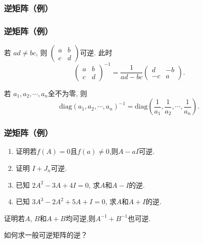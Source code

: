 \subsubsection{逆矩阵（例）}
\begin{frame}\frametitle{逆矩阵（例）}
\begin{example}
若 $ad\neq bc$, 则 $\begin{pmatrix}a&b\\c&d\end{pmatrix}$可逆. 此时
\[\begin{pmatrix}a&b\\c&d\end{pmatrix}^{-1} = \frac{1}{ad-bc} \begin{pmatrix}d&-b\\-c&a\end{pmatrix}.\]
\end{example}
\pp
\begin{example}
若 $a_1,a_2,\cdots, a_n$全不为零, 则
\[\mathrm{diag}(a_1,a_2,\cdots,a_n)^{-1} = \mathrm{diag}\left(\frac1{a_1},\frac1{a_2},\cdots,\frac1{a_n}\right).\]
\end{example}
\end{frame}






\begin{frame}\frametitle{逆矩阵（例）}
\begin{example}
\begin{enumerate}
\item 证明若$f(A)=0$且$f(a)\neq0$,则$A-aI$可逆. \pp
\item 证明 $I+J_n$可逆. \pp
\item 已知 $2A^2-3A+4I=0$, 求$A$和$A-I$的逆. \pp
\item 已知 $3A^3-2A^2+5A+I=0$, 求$A$和$A+I$的逆. \pp
\end{enumerate}
\end{example}
\begin{example}
证明若$A$, $B$和$A+B$均可逆,则$A^{-1}+B^{-1}$也可逆.
\end{example}
\pp

 如何求一般可逆矩阵的逆？
\end{frame}





\renewcommand{\mydate}{2025年3月13号\quad 第六次课}






